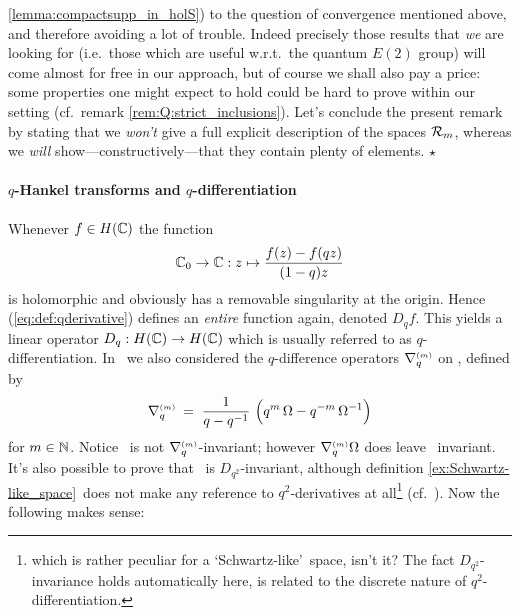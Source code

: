 \begin{remark}
\ref{lemma:compactsupp_in_holS}) to the question of convergence mentioned above,
and therefore avoiding a lot of trouble.
Indeed precisely those results that {\em we\/} are looking for
(i.e.\ those which are useful w.r.t.\ the quantum $E(2)$ group) will come
almost for free in our approach, but of course we shall also pay a price:
some properties one might expect to hold could be hard to prove within our setting
(cf.\ remark \ref{rem:Q:strict_inclusions}).
Let's conclude the present remark by stating that we {\em won't\/} give a full
explicit description of the spaces ${\mathcal R}_{m}$, whereas we {\em will\/}
show---constructively---that they contain plenty of elements.
\hfill $\star$
\end{remark}



\paragraph{$q$-Hankel transforms and $q$-differentiation}
Whenever $f \in H(\mathbb{C})$ the function
\begin{equation}\label{eq:def:qderivative}
  \mathbb{C}_0 \rightarrow \mathbb{C} : z \mapsto \frac{f(z)-f(qz)}{(1-q)z}
\end{equation}
is holomorphic and obviously has a removable singularity at the origin.
Hence (\ref{eq:def:qderivative}) defines an {\em entire\/} function again,
denoted $D_q f$. This yields a linear operator $D_q: H(\mathbb{C}) \rightarrow H(\mathbb{C})$
which is usually referred to as $q$-differentiation.
In \cite[\S 3.3]{Jeroen:QE2:haar}\ we also considered the $q$-difference
operators $\nabla_q^{\scriptscriptstyle (m)}$ on \HC, defined by
\begin{equation}\label{eq:def:nabq}
 \nabq{m} \:=\;  \frac{1}{q-q^{-1}}
        \,\left( q^m\, \Omega  - q^{-m}\, \Omega^{-1} \vertL\right)
\end{equation}
for $m\in\mathbb{N}$.
Notice \Swqbis\ is not \mbox{$\nabla_q^{\scriptscriptstyle (m)}$-invariant};
however $\nabla_q^{\scriptscriptstyle (m)} \Omega$ does leave \Swqbis\ invariant.
It's also possible to prove that \Swqbis\ is $D_{q^2}$-invariant,
although definition \ref{ex:Schwartz-like_space}\ does not make
any reference to $q^2$-derivatives at
all\footnote{which is rather peculiar for a \lq Schwartz-like\rq\ space,
isn't it? The fact $D_{q^2}$-invariance holds automatically here, is related to the
discrete nature of $q^2$-differentiation.} (cf.\ \cite[\S 3.4]{Jeroen:QE2:haar}).
Now the following makes sense:


